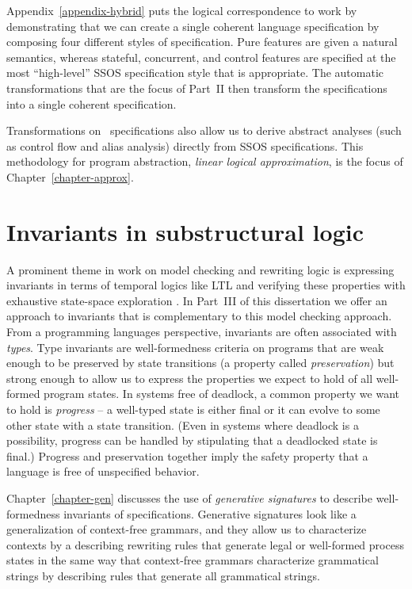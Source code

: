 Appendix~\ref{appendix-hybrid} puts the logical correspondence to work
by demonstrating that we can create a single coherent language
specification by composing four different styles of specification.
Pure features are given a natural semantics, whereas stateful,
concurrent, and control features are specified at the most
``high-level'' SSOS specification style that is appropriate. The
automatic transformations that are the focus of Part~II then transform
the specifications into a single coherent specification.

Transformations on \sls~specifications also allow us to derive
abstract analyses (such as control flow and alias analysis) directly
from SSOS specifications. This methodology for program abstraction,
{\it linear logical approximation}, is the focus of
Chapter~\ref{chapter-approx}.

\section{Invariants in substructural logic}

A prominent theme in work on model checking and rewriting logic is
expressing invariants in terms of temporal logics like LTL and
verifying these properties with exhaustive state-space exploration
\cite[Chapter 10]{clavel11ltl}.
In Part~III of this dissertation
we offer an approach to invariants that is complementary to
this model checking approach.  From a programming languages
perspective, invariants are often associated with {\it types}. Type
invariants are well-formedness criteria on programs that are weak
enough to be preserved by state transitions (a property called {\it
  preservation}) but strong enough to allow us to express the properties
we expect to hold of all well-formed program states. In systems free
of deadlock, a common property we want to hold is {\it progress} -- a
well-typed state is either final or it can evolve to some other state with a
state transition. (Even in systems where deadlock is a possibility,
progress can be handled by stipulating that a deadlocked state is
final.) Progress and preservation together imply the safety property
that a language is free of unspecified behavior. 

Chapter~\ref{chapter-gen} discusses the use of {\it generative signatures} to
describe well-formedness invariants of specifications. Generative
signatures look like a generalization of 
context-free grammars, and they allow us to
characterize contexts by a describing rewriting rules that generate
legal or well-formed
process states in the same way that context-free grammars characterize
grammatical strings by describing rules that generate all grammatical
strings.


